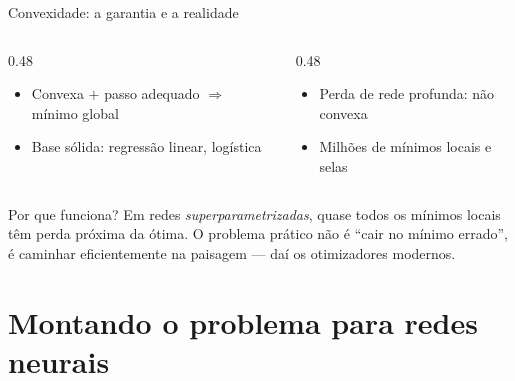 \documentclass[aspectratio=169, 11pt]{beamer}
\begin{document}
\begin{frame}{Convexidade: a garantia e a realidade}
  \begin{columns}[T]
    \begin{column}{0.48\textwidth}
      \begin{tcolorbox}[iccaixa=icCiano, title={O que a teoria garante}]
        \begin{itemize}\setlength{\itemsep}{0.2ex}
          \item Convexa $+$ passo adequado $\Rightarrow$ mínimo global
          \item Base sólida: regressão linear, logística
        \end{itemize}
      \end{tcolorbox}
    \end{column}
    \begin{column}{0.48\textwidth}
      \begin{tcolorbox}[iccaixa=icMagenta, title={O que o deep learning vive}]
        \begin{itemize}\setlength{\itemsep}{0.2ex}
          \item Perda de rede profunda: \alert{não convexa}
          \item Milhões de mínimos locais e selas
        \end{itemize}
      \end{tcolorbox}
    \end{column}
  \end{columns}

  \medskip
  \begin{ideiabox}
    Por que funciona? Em redes \emph{superparametrizadas}, quase todos os
    mínimos locais têm perda próxima da ótima. O problema prático não é
    ``cair no mínimo errado'', é caminhar eficientemente na paisagem — daí os
    otimizadores modernos.
  \end{ideiabox}
\end{frame}

\section{Montando o problema para redes neurais}
\end{document}
